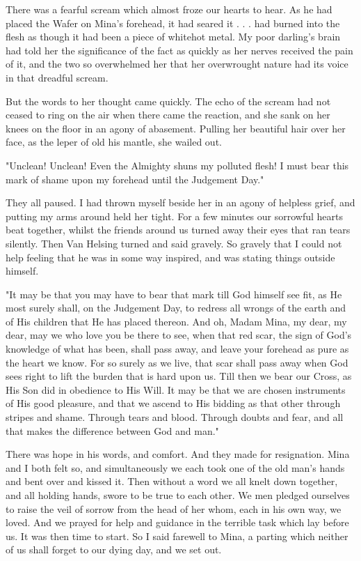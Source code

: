 There was a fearful scream which almost froze our hearts to hear. As he had placed the Wafer on Mina's forehead, it had seared it . . . had burned into the flesh as though it had been a piece of whitehot metal. My poor darling's brain had told her the significance of the fact as quickly as her nerves received the pain of it, and the two so overwhelmed her that her overwrought nature had its voice in that dreadful scream. 

But the words to her thought came quickly. The echo of the scream had not ceased to ring on the air when there came the reaction, and she sank on her knees on the floor in an agony of abasement. Pulling her beautiful hair over her face, as the leper of old his mantle, she wailed out. 

"Unclean! Unclean! Even the Almighty shuns my polluted flesh! I must bear this mark of shame upon my forehead until the Judgement Day." 

They all paused. I had thrown myself beside her in an agony of helpless grief, and putting my arms around held her tight. For a few minutes our sorrowful hearts beat together, whilst the friends around us turned away their eyes that ran tears silently. Then Van Helsing turned and said gravely. So gravely that I could not help feeling that he was in some way inspired, and was stating things outside himself. 

"It may be that you may have to bear that mark till God himself see fit, as He most surely shall, on the Judgement Day, to redress all wrongs of the earth and of His children that He has placed thereon. And oh, Madam Mina, my dear, my dear, may we who love you be there to see, when that red scar, the sign of God's knowledge of what has been, shall pass away, and leave your forehead as pure as the heart we know. For so surely as we live, that scar shall pass away when God sees right to lift the burden that is hard upon us. Till then we bear our Cross, as His Son did in obedience to His Will. It may be that we are chosen instruments of His good pleasure, and that we ascend to His bidding as that other through stripes and shame. Through tears and blood. Through doubts and fear, and all that makes the difference between God and man." 

There was hope in his words, and comfort. And they made for resignation. Mina and I both felt so, and simultaneously we each took one of the old man's hands and bent over and kissed it. Then without a word we all knelt down together, and all holding hands, swore to be true to each other. We men pledged ourselves to raise the veil of sorrow from the head of her whom, each in his own way, we loved. And we prayed for help and guidance in the terrible task which lay before us. It was then time to start. So I said farewell to Mina, a parting which neither of us shall forget to our dying day, and we set out. 

